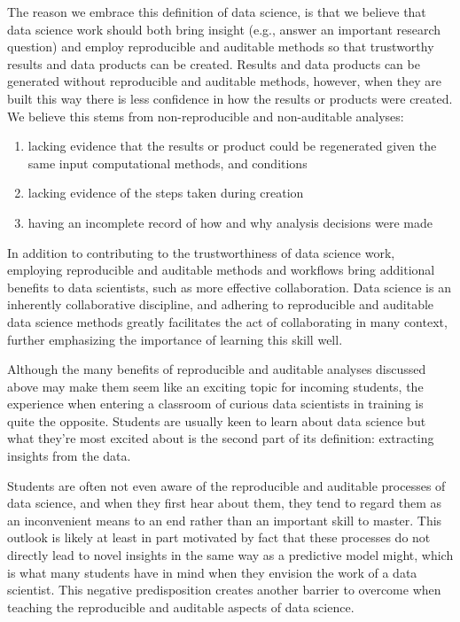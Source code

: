 \documentclass{article}
\begin{document}
The reason we embrace this definition of data science, is that we
believe that data science work should both bring insight (e.g., answer
an important research question) and employ reproducible and auditable
methods so that trustworthy results and data products can be created.
Results and data products can be generated without reproducible and
auditable methods, however, when they are built this way there is less
confidence in how the results or products were created. We believe this
stems from non-reproducible and non-auditable analyses:

\begin{enumerate}
\def\labelenumi{\arabic{enumi}.}
\tightlist
\item
  lacking evidence that the results or product could be regenerated
  given the same input computational methods, and conditions
\item
  lacking evidence of the steps taken during creation
\item
  having an incomplete record of how and why analysis decisions were
  made
\end{enumerate}

In addition to contributing to the trustworthiness of data science work,
employing reproducible and auditable methods and workflows bring
additional benefits to data scientists, such as more effective
collaboration. Data science is an inherently collaborative discipline,
and adhering to reproducible and auditable data science methods greatly
facilitates the act of collaborating in many context, further
emphasizing the importance of learning this skill well.

Although the many benefits of reproducible and auditable analyses
discussed above may make them seem like an exciting topic for incoming
students, the experience when entering a classroom of curious data
scientists in training is quite the opposite. Students are usually keen
to learn about data science but what they're most excited about is the
second part of its definition: extracting insights from the data.

Students are often not even aware of the reproducible and auditable
processes of data science, and when they first hear about them, they
tend to regard them as an inconvenient means to an end rather than an
important skill to master. This outlook is likely at least in part
motivated by fact that these processes do not directly lead to novel
insights in the same way as a predictive model might, which is what many
students have in mind when they envision the work of a data scientist.
This negative predisposition creates another barrier to overcome when
teaching the reproducible and auditable aspects of data science.
\end{document}
